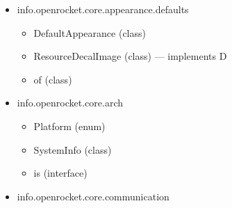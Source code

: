 \documentclass{amsdtx}
\begin{document}
\begin{itemize}
\begin{itemize}
\begin{itemize}
    \item
      Appearance (class)
    \item
      AppearanceBuilder (class) --- extends A
    \item
      Decal (class)
    \item
      DecalImage (interface) --- extends C
    \item
      EdgeMode (enum)
    \item
      is (class)
    \item
      is (class)
    \item
      repeatedly (class)
    \item
      to (class)
    \item
      to (enum)
    \end{itemize}
  \item
    info.openrocket.core.appearance.defaults

    \begin{itemize}
    
    \item
      DefaultAppearance (class)
    \item
      ResourceDecalImage (class) --- implements D
    \item
      of (class)
    \end{itemize}
  \item
    info.openrocket.core.arch

    \begin{itemize}
    
    \item
      Platform (enum)
    \item
      SystemInfo (class)
    \item
      is (interface)
    \end{itemize}
  \item
    info.openrocket.core.communication

    \begin{itemize}
    

\end{itemize}
\end{itemize}
\end{itemize}
\end{document}
